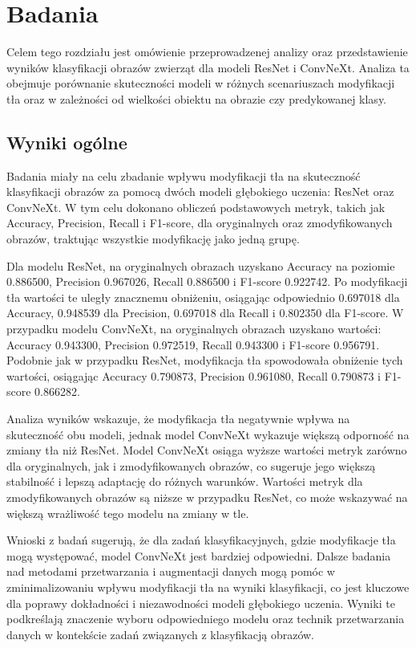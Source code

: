 \chapter*{Badania}

Celem tego rozdziału jest omówienie przeprowadzenej analizy oraz przedstawienie wyników klasyfikacji obrazów zwierząt dla modeli ResNet i ConvNeXt. Analiza ta obejmuje porównanie skuteczności modeli w różnych scenariuszach modyfikacji tła 
oraz w zależności od wielkości obiektu na obrazie czy predykowanej klasy.

\section*{Wyniki ogólne}

Badania miały na celu zbadanie wpływu modyfikacji tła na skuteczność klasyfikacji obrazów za pomocą dwóch modeli głębokiego uczenia: ResNet 
oraz ConvNeXt. W tym celu dokonano obliczeń podstawowych metryk, takich jak Accuracy, Precision, Recall i F1-score, dla oryginalnych oraz 
zmodyfikowanych obrazów, traktując wszystkie modyfikację jako jedną grupę.

Dla modelu ResNet, na oryginalnych obrazach uzyskano Accuracy na poziomie 0.886500, Precision 0.967026, Recall 0.886500 i F1-score 0.922742. 
Po modyfikacji tła wartości te uległy znacznemu obniżeniu, osiągając odpowiednio 0.697018 dla Accuracy, 0.948539 dla Precision, 0.697018 dla 
Recall i 0.802350 dla F1-score. W przypadku modelu ConvNeXt, na oryginalnych obrazach uzyskano wartości: Accuracy 0.943300, Precision 0.972519, 
Recall 0.943300 i F1-score 0.956791. Podobnie jak w przypadku ResNet, modyfikacja tła spowodowała obniżenie tych wartości, osiągając 
Accuracy 0.790873, Precision 0.961080, Recall 0.790873 i F1-score 0.866282.

Analiza wyników wskazuje, że modyfikacja tła negatywnie wpływa na skuteczność obu modeli, jednak model ConvNeXt wykazuje większą odporność na 
zmiany tła niż ResNet. Model ConvNeXt osiąga wyższe wartości metryk zarówno dla oryginalnych, jak i zmodyfikowanych obrazów, co sugeruje jego 
większą stabilność i lepszą adaptację do różnych warunków. Wartości metryk dla zmodyfikowanych obrazów są niższe w przypadku ResNet, co może 
wskazywać na większą wrażliwość tego modelu na zmiany w tle.

Wnioski z badań sugerują, że dla zadań klasyfikacyjnych, gdzie modyfikacje tła mogą występować, model ConvNeXt jest bardziej odpowiedni. 
Dalsze badania nad metodami przetwarzania i augmentacji danych mogą pomóc w zminimalizowaniu wpływu modyfikacji tła na wyniki klasyfikacji, 
co jest kluczowe dla poprawy dokładności i niezawodności modeli głębokiego uczenia. Wyniki te podkreślają znaczenie wyboru odpowiedniego 
modelu oraz technik przetwarzania danych w kontekście zadań związanych z klasyfikacją obrazów.

